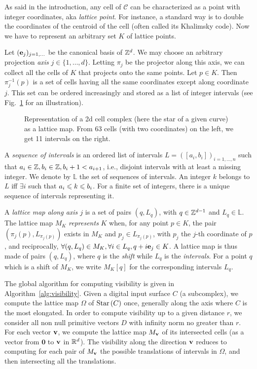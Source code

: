 As said in the introduction, any cell of $\mathcal{C}$ can be
characterized as a point with integer coordinates, aka \emph{lattice
point}. For instance, a standard way is to double the coordinates of
the centroid of the cell (often called its Khalimsky code). Now we
have to represent an arbitrary set $K$ of lattice points.

Let $(\mathbf{e}_j)_{j=1,\dots}$ be the canonical basis of $\mathbb{Z}^d$.  We may
choose an arbitrary projection \emph{axis} $j \in
\{1,\ldots,d\}$. Letting $\pi_j$ be the projector along this axis, we
can collect all the cells of $K$ that projects onto the same
points. Let $p \in K$. Then $\pi^{-1}_j(p)$ is a set of cells having
all the same coordinates except along coordinate $j$. This set can be
ordered increasingly and stored as a list of integer intervals (see
Fig.~\ref{fig:lattice-representation} for an illustration).

\begin{figure}[t]
  \centering
  
  \caption{\label{fig:lattice-representation} Representation of a
    2d cell complex (here the star of a given curve) as a lattice
    map. From 63 cells (with two coordinates) on the left, we get 11
    intervals on the right.}
\end{figure}


A \emph{sequence of intervals} is an ordered list of intervals $L =
([a_i,b_i])_{i=1,\ldots,n}$ such that $a_i \in \mathbb{Z}, b_i \in \mathbb{Z}, b_i + 1
< a_{i+1}$, i.e., disjoint intervals with at least a missing
integer. We denote by $\mathbb{L}$ the set of sequences of
intervals. An integer $k$ belongs to $L$ iff $\exists i$ such that
$a_i \leqslant k \leqslant b_i$. For a finite set of integers, there is a unique
sequence of intervals representing it.

A \emph{lattice map along axis $j$} is a set of pairs $(q,L_q)$, with
$q \in \mathbb{Z}^{d-1}$ and $L_q \in \mathbb{L}$. The lattice map $M_K$
\emph{represents} $K$ when, for any point $p \in K$, the pair
$(\pi_j(p), L_{\pi_j(p)})$ exists in $M_K$ and $p_j \in L_{\pi_j(p)}$,
with $p_j$ the $j$-th coordinate of $p$, and reciprocally, $\forall
(q,L_q) \in M_K, \forall i \in L_q, q+i\mathbf{e}_j \in K$. A lattice map is
thus made of pairs $(q,L_q)$, where $q$ is the \emph{shift} while
$L_q$ is the \emph{intervals}. For a point $q$ which is a shift of
$M_K$, we write $M_K[q]$ for the corresponding intervals $L_q$.

The global algorithm for computing visibility is given in
Algorithm~\ref{alg:visibility}.  Given a digital input surface $C$ (a
subcomplex), we compute the lattice map $\Omega$ of $\mathrm{Star}\left(C\right)$ once,
generally along the axis where $C$ is the most elongated. In order to
compute visibility up to a given distance $r$, we consider all non
null primitive vectors $D$ with infinity norm no greater than $r$.
For each vector $\mathbf{v}$, we compute the lattice map $M_{\mathbf{v}}$ of its
intersected cells (as a vector from $\mathbf{0}$ to $\mathbf{v}$ in
$\mathbb{R}^d$). The visibility along the direction $\mathbf{v}$ reduces to computing
for each pair of $M_{\mathbf{v}}$ the possible translations of intervals in
$\Omega$, and then intersecting all the translations.

